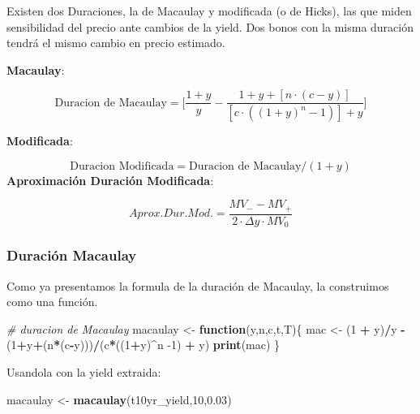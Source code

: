 \documentclass[12pt,]{book}
\newenvironment{Shaded}{\begin{snugshade}}{\end{snugshade}}
\newcommand{\KeywordTok}[1]{\textcolor[rgb]{0.13,0.29,0.53}{\textbf{#1}}}
\newcommand{\DecValTok}[1]{\textcolor[rgb]{0.00,0.00,0.81}{#1}}
\newcommand{\FloatTok}[1]{\textcolor[rgb]{0.00,0.00,0.81}{#1}}
\newcommand{\StringTok}[1]{\textcolor[rgb]{0.31,0.60,0.02}{#1}}
\newcommand{\CommentTok}[1]{\textcolor[rgb]{0.56,0.35,0.01}{\textit{#1}}}
\newcommand{\ControlFlowTok}[1]{\textcolor[rgb]{0.13,0.29,0.53}{\textbf{#1}}}
\newcommand{\OperatorTok}[1]{\textcolor[rgb]{0.81,0.36,0.00}{\textbf{#1}}}
\newcommand{\NormalTok}[1]{#1}
\begin{document}
Existen dos Duraciones, la de Macaulay y modificada (o de Hicks), las
que miden sensibilidad del precio ante cambios de la yield. Dos bonos
con la misma duración tendrá el mismo cambio en precio estimado.

\textbf{Macaulay}:

\[
\text{Duracion de Macaulay} =\bigg[ \frac{1 + y}{y} - \frac{1+y + [n \cdot (c - y)]}{[ c\cdot((1+y)^n - 1)]+y} \bigg]
\]

\textbf{Modificada}:

\[
\text{Duracion Modificada} = \text{Duracion de Macaulay}/(1+y)
\] \textbf{Aproximación Duración Modificada}:

\[
Aprox.Dur.Mod.= \frac{MV_{-}-MV_{+}}{2 \cdot \Delta y \cdot MV_{0}}
\]

\subsubsection{Duración Macaulay}\label{duracion-macaulay}

Como ya presentamos la formula de la duración de Macaulay, la
construimos como una función.

\begin{Shaded}
\begin{Highlighting}[]
\CommentTok{# duracion de Macaulay}
\NormalTok{macaulay <-}\StringTok{ }\ControlFlowTok{function}\NormalTok{(y,n,c,t,T)\{}
\NormalTok{         mac <-}\StringTok{ }\NormalTok{(}\DecValTok{1} \OperatorTok{+}\StringTok{ }\NormalTok{y)}\OperatorTok{/}\NormalTok{y }\OperatorTok{-}\StringTok{ }\NormalTok{(}\DecValTok{1}\OperatorTok{+}\NormalTok{y}\OperatorTok{+}\NormalTok{(n}\OperatorTok{*}\NormalTok{(c}\OperatorTok{-}\NormalTok{y)))}\OperatorTok{/}\NormalTok{(c}\OperatorTok{*}\NormalTok{((}\DecValTok{1}\OperatorTok{+}\NormalTok{y)}\OperatorTok{^}\NormalTok{n }\DecValTok{-1}\NormalTok{) }\OperatorTok{+}\StringTok{ }\NormalTok{y)}
         \KeywordTok{print}\NormalTok{(mac)}
\NormalTok{\} }
\end{Highlighting}
\end{Shaded}

Usandola con la yield extraida:

\begin{Shaded}
\begin{Highlighting}[]
\NormalTok{macaulay <-}\StringTok{ }\KeywordTok{macaulay}\NormalTok{(t10yr_yield,}\DecValTok{10}\NormalTok{,}\FloatTok{0.03}\NormalTok{)}
\end{Highlighting}
\end{Shaded}
\end{document}
